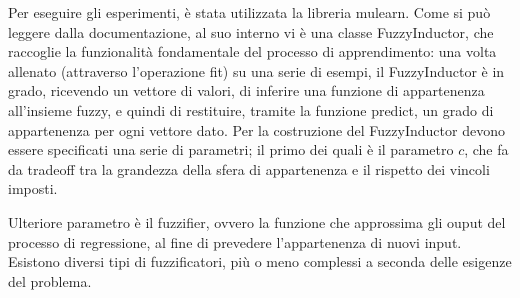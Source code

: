 \documentclass[12pt,a4paper]{report}
\begin{document}
Per eseguire gli esperimenti, è stata utilizzata la libreria mulearn\cite{mulearn}.
Come si può leggere dalla documentazione, al suo interno vi è una classe FuzzyInductor, che raccoglie la funzionalità fondamentale del processo di apprendimento: una volta allenato (attraverso l'operazione fit) su una serie di esempi, il FuzzyInductor è in grado, ricevendo un vettore di valori, di inferire una funzione di appartenenza all'insieme fuzzy, e quindi di restituire, tramite la funzione predict, un grado di appartenenza per ogni vettore dato.
Per la costruzione del FuzzyInductor devono essere specificati una serie di parametri; il primo dei quali è il parametro $c$, che fa da tradeoff tra la grandezza della sfera di appartenenza e il rispetto dei vincoli imposti. 

Ulteriore parametro è il fuzzifier, ovvero la funzione che approssima gli ouput del processo di regressione, al fine di prevedere l'appartenenza di nuovi input. Esistono diversi tipi di fuzzificatori, più o meno complessi a seconda delle esigenze del problema.
\end{document}
